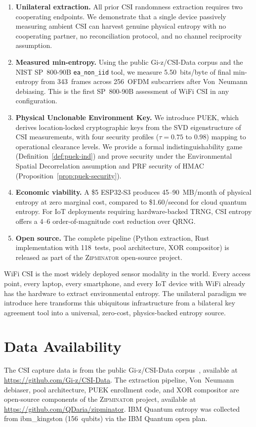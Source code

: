 \documentclass[sigconf,nonacm=false]{acmart}
\newcommand{\zipminator}{\textsc{Zipminator}\xspace}
\begin{document}
\begin{enumerate}
\item \textbf{Unilateral extraction.}
All prior CSI randomness extraction requires two cooperating endpoints.
We demonstrate that a single device passively measuring ambient CSI can harvest genuine physical entropy with no cooperating partner, no reconciliation protocol, and no channel reciprocity assumption.

\item \textbf{Measured min-entropy.}
Using the public Gi-z/CSI-Data corpus and the NIST SP~800-90B \texttt{ea\_non\_iid} tool, we measure 5.50~bits/byte of final min-entropy from 343~frames across 256~OFDM subcarriers after Von~Neumann debiasing.
This is the first SP~800-90B assessment of WiFi CSI in any configuration.

\item \textbf{Physical Unclonable Environment Key.}
We introduce PUEK, which derives location-locked cryptographic keys from the SVD eigenstructure of CSI measurements, with four security profiles ($\tau = 0.75$ to $0.98$) mapping to operational clearance levels.
We provide a formal indistinguishability game (Definition~\ref{def:puek-ind}) and prove security under the Environmental Spatial Decorrelation assumption and PRF security of HMAC (Proposition~\ref{prop:puek-security}).

\item \textbf{Economic viability.}
A \$5 ESP32-S3 produces 45--90~MB/month of physical entropy at zero marginal cost, compared to \$1.60/second for cloud quantum entropy.
For IoT deployments requiring hardware-backed TRNG, CSI entropy offers a 4--6 order-of-magnitude cost reduction over QRNG.

\item \textbf{Open source.}
The complete pipeline (Python extraction, Rust implementation with 118~tests, pool architecture, XOR compositor) is released as part of the \zipminator open-source project.
\end{enumerate}

WiFi CSI is the most widely deployed sensor modality in the world.
Every access point, every laptop, every smartphone, and every IoT device with WiFi already has the hardware to extract environmental entropy.
The unilateral paradigm we introduce here transforms this ubiquitous infrastructure from a bilateral key agreement tool into a universal, zero-cost, physics-backed entropy source.

\section*{Data Availability}
The CSI capture data is from the public Gi-z/CSI-Data corpus~\cite{gringoli2019csidata}, available at \url{https://github.com/Gi-z/CSI-Data}.
The extraction pipeline, Von~Neumann debiaser, pool architecture, PUEK enrollment code, and XOR compositor are open-source components of the \zipminator project, available at \url{https://github.com/QDaria/zipminator}.
IBM Quantum entropy was collected from ibm\_kingston (156~qubits) via the IBM Quantum open plan.
\end{document}

